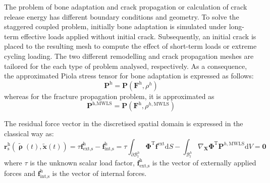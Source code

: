 \documentclass[review]{elsarticle}
\numberwithin{equation}{section}
\begin{document}
The problem of bone adaptation and crack propagation or calculation of crack
release energy has different boundary conditions and geometry. 
To solve the staggered coupled problem, initially bone adaptation is simulated under 
long-term effective loads applied without initial crack. Subsequently, an 
initial crack is placed to the resulting mesh to compute the effect 
of short-term loads or extreme cycling loading. The two different remodelling and crack propagation 
meshes are tailored for the each type of problem analysed, respectively. As
a consequence, the approximated Piola stress tensor for bone
adaptation is expressed as follows:
\begin{equation}
	\mathbf{P}^\textrm{h} = 
		\mathbf{P}(\mathbf{F}^\textrm{h}, \rho^h)
\end{equation}
whereas for the fracture propagation problem, it is approximated as
\begin{equation}
	\mathbf{P}^{\textrm{h},\textrm{MWLS}} = 
		\mathbf{P}(
		\mathbf{F}^\textrm{h}, \rho^{h,\textrm{MWLS}})
\end{equation}


The residual force vector in the discretised spatial domain is expressed in the classical way as:
\begin{equation}
\label{spatial_residual}
	\mathbf{r}_\textrm{s}^\textrm{h}(\tilde{\pmb\uprho}(t), \tilde{\mathbf{x}}(t)) = \tau\mathbf{f}^\textrm{h}_\textrm{ext,s}-\mathbf{f}^\textrm{h}_\textrm{int,s}=\tau \int_{\partial\mathcal{B}^h_t} \pmb{\Phi}^\textrm{T}
	\mathbf{f}^\textrm{ext}
	\textrm{d}S-
	\int_{\mathcal{B}^h_t} \nabla_\mathbf{X} \pmb{\Phi}^\textrm{T}
	\mathbf{P}^{h,\textrm{MWLS}}\textrm{d}V=\mathbf{0}
\end{equation}
where $\tau$ is the unknown scalar load factor, $\mathbf{f}^\textrm{h}_\textrm{ext,s}$ is the vector of externally applied forces and $\mathbf{f}^\textrm{h}_\textrm{int,s}$ is the vector of internal forces. 
\end{document}
